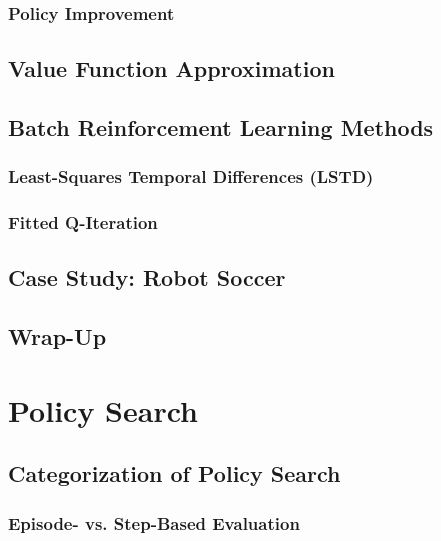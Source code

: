 		\subsection{Policy Improvement} %

	\section{Value Function Approximation} %

	\section{Batch Reinforcement Learning Methods} %

		\subsection{Least-Squares Temporal Differences (LSTD)} %

		\subsection{Fitted Q-Iteration} %

	\section{Case Study: Robot Soccer} %

	\section{Wrap-Up} %

\chapter{Policy Search} %

	\section{Categorization of Policy Search} %

		\subsection{Episode- vs. Step-Based Evaluation} %

